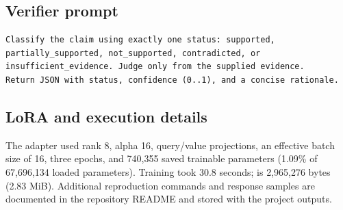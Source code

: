 \documentclass[12pt,toc=bib,toc=listof]{scrartcl}
\begin{document}
\subsection{Verifier prompt}
\begin{verbatim}
Classify the claim using exactly one status: supported,
partially_supported, not_supported, contradicted, or
insufficient_evidence. Judge only from the supplied evidence.
Return JSON with status, confidence (0..1), and a concise rationale.
\end{verbatim}

\subsection{LoRA and execution details}
The adapter used rank 8, alpha 16, query/value projections, an effective batch size of 16, three epochs, and 740,355 saved trainable parameters (1.09\% of 67,696,134 loaded parameters). Training took 30.8 seconds;  is 2,965,276 bytes (2.83 MiB). Additional reproduction commands and response samples are documented in the repository README and stored with the project outputs.
\end{document}

